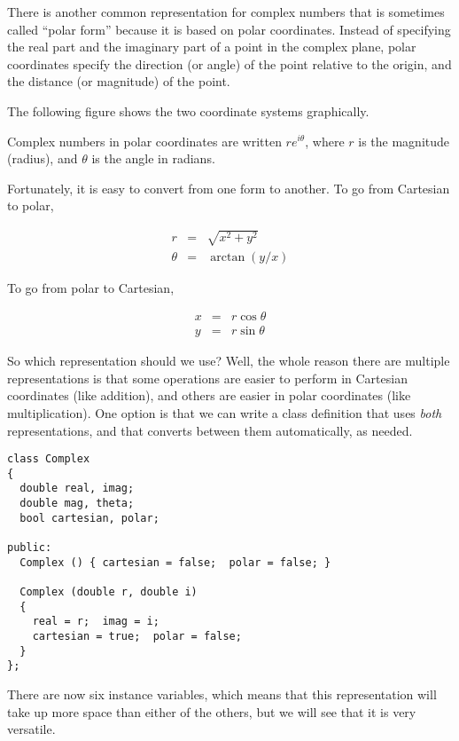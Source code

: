 There is another common representation for complex numbers that is
sometimes called ``polar form'' because it is based on polar
coordinates.  Instead of specifying the real part and the imaginary
part of a point in the complex plane, polar coordinates specify the
direction (or angle) of the point relative to the origin, and
the distance (or magnitude) of the point.  

The following figure shows the two coordinate systems graphically.

\vspace {0.1in}
\centerline{}
\vspace {0.1in}

Complex numbers in polar coordinates are written $r e^{i \theta}$,
where $r$ is the magnitude (radius), and $\theta$ is the angle in
radians.

Fortunately, it is easy to convert from one form to another.
To go from Cartesian to polar,

\begin{eqnarray*}
r       & = &  \sqrt{x^2 + y^2} \\
\theta  & = &  \arctan (y / x)
\end{eqnarray*}

To go from polar to Cartesian,

\begin{eqnarray*}
x       & = &  r \cos \theta \\
y       & = &  r \sin \theta
\end{eqnarray*}

So which representation should we use?  Well, the whole reason there
are multiple representations is that some operations are easier to
perform in Cartesian coordinates (like addition), and others are
easier in polar coordinates (like multiplication).  One option is that
we can write a class definition that uses {\em both} representations,
and that converts between them automatically, as needed.

\begin{verbatim}
class Complex
{
  double real, imag;
  double mag, theta;
  bool cartesian, polar;

public:
  Complex () { cartesian = false;  polar = false; }

  Complex (double r, double i)
  {
    real = r;  imag = i;
    cartesian = true;  polar = false;
  }
};
\end{verbatim}
%
There are now six instance variables, which means that
this representation will take up more space than either
of the others, but we will see that it is very versatile.

